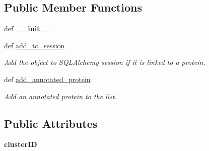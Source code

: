 \subsection*{Public Member Functions}
\begin{DoxyCompactItemize}
\item 
\hypertarget{classsrc_1_1fr_1_1tagc_1_1rainet_1_1core_1_1data_1_1WanCluster_1_1WanCluster_a8ba56375c6f5332852dfba002a5118dc}{def {\bfseries \-\_\-\-\_\-init\-\_\-\-\_\-}}\label{classsrc_1_1fr_1_1tagc_1_1rainet_1_1core_1_1data_1_1WanCluster_1_1WanCluster_a8ba56375c6f5332852dfba002a5118dc}

\item 
\hypertarget{classsrc_1_1fr_1_1tagc_1_1rainet_1_1core_1_1data_1_1WanCluster_1_1WanCluster_a72225f12caaefff0da8fd096f2b9f53e}{def \hyperlink{classsrc_1_1fr_1_1tagc_1_1rainet_1_1core_1_1data_1_1WanCluster_1_1WanCluster_a72225f12caaefff0da8fd096f2b9f53e}{add\-\_\-to\-\_\-session}}\label{classsrc_1_1fr_1_1tagc_1_1rainet_1_1core_1_1data_1_1WanCluster_1_1WanCluster_a72225f12caaefff0da8fd096f2b9f53e}

\begin{DoxyCompactList}\small\item\em Add the object to S\-Q\-L\-Alchemy session if it is linked to a protein. \end{DoxyCompactList}\item 
\hypertarget{classsrc_1_1fr_1_1tagc_1_1rainet_1_1core_1_1data_1_1WanCluster_1_1WanCluster_a6938dd4c150caa98f7d241558755fcb3}{def \hyperlink{classsrc_1_1fr_1_1tagc_1_1rainet_1_1core_1_1data_1_1WanCluster_1_1WanCluster_a6938dd4c150caa98f7d241558755fcb3}{add\-\_\-annotated\-\_\-protein}}\label{classsrc_1_1fr_1_1tagc_1_1rainet_1_1core_1_1data_1_1WanCluster_1_1WanCluster_a6938dd4c150caa98f7d241558755fcb3}

\begin{DoxyCompactList}\small\item\em Add an annotated protein to the list. \end{DoxyCompactList}\end{DoxyCompactItemize}
\subsection*{Public Attributes}
\begin{DoxyCompactItemize}
\item 
\hypertarget{classsrc_1_1fr_1_1tagc_1_1rainet_1_1core_1_1data_1_1WanCluster_1_1WanCluster_a3a03db07c78bfc92c7f38de1718e2bb5}{{\bfseries cluster\-I\-D}}\label{classsrc_1_1fr_1_1tagc_1_1rainet_1_1core_1_1data_1_1WanCluster_1_1WanCluster_a3a03db07c78bfc92c7f38de1718e2bb5}

\end{DoxyCompactItemize}
